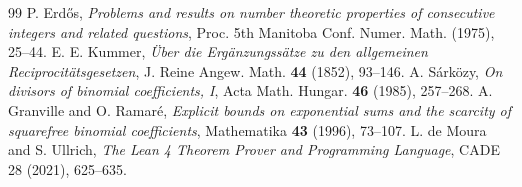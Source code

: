 \documentclass[11pt,a4paper]{article}
\theoremstyle{definition}
\begin{document}
\begin{thebibliography}{99}
 P. Erd\H{o}s, \textit{Problems and results on number theoretic properties of consecutive integers and related questions}, Proc. 5th Manitoba Conf. Numer. Math. (1975), 25--44.
 E. E. Kummer, \textit{\"Uber die Erg\"anzungss\"atze zu den allgemeinen Reciprocit\"atsgesetzen}, J. Reine Angew. Math. \textbf{44} (1852), 93--146.
 A. S\'ark\"ozy, \textit{On divisors of binomial coefficients, I}, Acta Math. Hungar. \textbf{46} (1985), 257--268.
 A. Granville and O. Ramar\'e, \textit{Explicit bounds on exponential sums and the scarcity of squarefree binomial coefficients}, Mathematika \textbf{43} (1996), 73--107.
 L. de Moura and S. Ullrich, \textit{The Lean 4 Theorem Prover and Programming Language}, CADE 28 (2021), 625--635.
\end{thebibliography}
\end{document}
